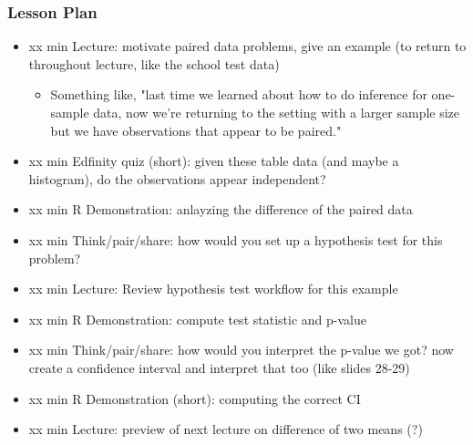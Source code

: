 \begin{frame}
    \frametitle{Lesson Plan}
    \begin{itemize}
        \item xx min Lecture: motivate paired data problems, give an example (to return to throughout lecture, like the school test data)
        \begin{itemize}
            \item Something like, "last time we learned about how to do inference for one-sample data, now we're returning to the setting with a larger sample size but we have observations that appear to be paired."
        \end{itemize}    
        \item xx min Edfinity quiz (short): given these table data (and maybe a histogram), do the observations appear independent?
        \item xx min R Demonstration: anlayzing the difference of the paired data 
        \item xx min Think/pair/share: how would you set up a hypothesis test for this problem?
        \item xx min Lecture: Review hypothesis test workflow for this example
        \item xx min R Demonstration: compute test statistic and p-value 
        \item xx min Think/pair/share: how would you interpret the p-value we got? now create a confidence interval and interpret that too (like slides 28-29)
        \item xx min R Demonstration (short): computing the correct CI
        \item xx min Lecture: preview of next lecture on difference of two means (?)
    \end{itemize}

\end{frame}
            
